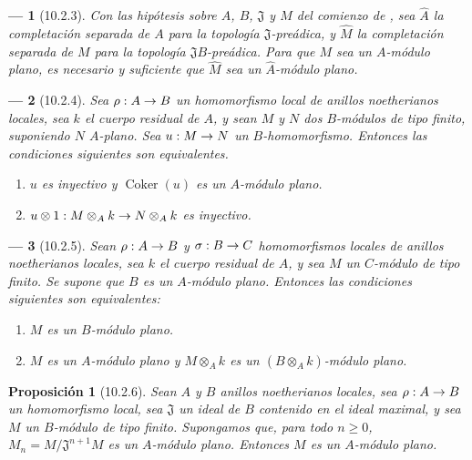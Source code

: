 \documentclass[10pt,oneside,openany]{book}
\theoremstyle{egaenv}\newtheorem*{env}{---}
\theoremstyle{egastatement}
\newtheorem*{proposition}{Proposición}
\theoremstyle{egadescription}
\renewcommand{\geq}{\geqslant}
\renewcommand{\to}{\mathchoice{\longrightarrow}{\rightarrow}{\rightarrow}{\rightarrow}}
\begin{document}
\begin{env}[10.2.3]
\label{0.10.2.3}
\label{0.10.2.3-fr}
Con las hipótesis sobre $A$, $B$, $\mathfrak{J}$ y $M$ del comienzo de , sea $\widehat A$ la completación separada de $A$ para la topología $\mathfrak{J}$-preádica, y $\widehat M$ la completación separada de $M$ para la topología $\mathfrak{J}B$-preádica.
Para que $M$ sea un $A$-módulo plano, es necesario y suficiente que $\widehat M$ sea un $\widehat A$-módulo plano.
\end{env}

\begin{env}[10.2.4]
\label{0.10.2.4}
\label{0.10.2.4-fr}
Sea $\rho:A\to B$ un homomorfismo local de anillos noetherianos locales, sea $k$ el cuerpo residual de $A$, y sean $M$ y $N$ dos $B$-módulos de tipo finito, suponiendo $N$ \emph{$A$-plano}.
Sea $u:M\to N$ un $B$-homomorfismo.
Entonces las condiciones siguientes son equivalentes.
\begin{enumerate}
  \item[(a)] $u$ es inyectivo y $\operatorname{Coker}(u)$ es un $A$-módulo plano.
  \item[(b)] $u\otimes1:M\otimes_A k\to N\otimes_A k$ es inyectivo.
\end{enumerate}
\end{env}

\begin{env}[10.2.5]
\label{0.10.2.5}
\label{0.10.2.5-fr}
Sean $\rho:A\to B$ y $\sigma:B\to C$ homomorfismos locales de anillos noetherianos locales, sea $k$ el cuerpo residual de $A$, y sea $M$ un $C$-módulo de tipo finito.
Se supone que $B$ es un $A$-módulo \emph{plano}. Entonces las condiciones siguientes son equivalentes:
\begin{enumerate}
  \item[$a)$] $M$ es un $B$-módulo plano.
  \item[$b)$] $M$ es un $A$-módulo plano y $M\otimes_A k$ es un $(B\otimes_A k)$-módulo plano.
\end{enumerate}
\end{env}

\begin{proposition}[10.2.6]
\label{0.10.2.6}
\label{0.10.2.6-fr}
Sean $A$ y $B$ anillos noetherianos locales, sea $\rho:A\to B$ un homomorfismo local, sea $\mathfrak{J}$ un ideal de $B$ contenido en el ideal maximal, y sea $M$ un $B$-módulo de tipo finito.
Supongamos que, para todo $n\geq0$, $M_n=M/\mathfrak{J}^{n+1}M$ es un $A$-módulo plano.
Entonces $M$ es un $A$-módulo plano.
\end{proposition}
\end{document}
